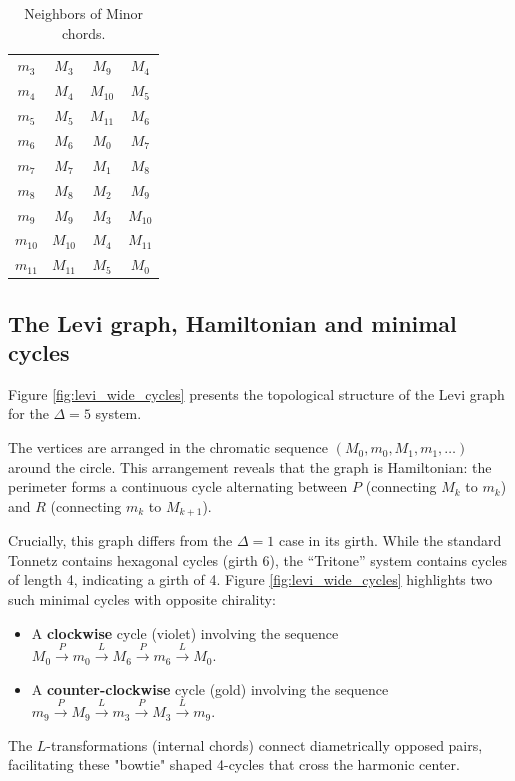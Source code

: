 \documentclass[12pt,letterpaper]{amsart}
\begin{document}
\begin{table}[H]
\begin{minipage}[t]{0.48\textwidth}
\begin{tabular}{|c||c|c|c|}
            $m_3$ & $M_3$ & $M_9$ & $M_4$ \\
            $m_4$ & $M_4$ & $M_{10}$ & $M_5$ \\
            $m_5$ & $M_5$ & $M_{11}$ & $M_6$ \\
            $m_6$ & $M_6$ & $M_0$ & $M_7$ \\
            $m_7$ & $M_7$ & $M_1$ & $M_8$ \\
            $m_8$ & $M_8$ & $M_2$ & $M_9$ \\
            $m_9$ & $M_9$ & $M_3$ & $M_{10}$ \\
            $m_{10}$ & $M_{10}$ & $M_4$ & $M_{11}$ \\
            $m_{11}$ & $M_{11}$ & $M_5$ & $M_0$ \\
            \hline
        \end{tabular}
        \caption{Neighbors of Minor chords.}
        \label{tab:neighbors_m_6_1}
    \end{minipage}
\end{table}

\subsection{The Levi graph, Hamiltonian and minimal cycles}

Figure \ref{fig:levi_wide_cycles} presents the topological structure of the Levi graph for the $\Delta=5$ system.

The vertices are arranged in the chromatic sequence $(M_0, m_0, M_1, m_1, \dots)$ around the circle. This arrangement reveals that the graph is Hamiltonian: the perimeter forms a continuous cycle alternating between $P$ (connecting $M_k$ to $m_k$) and $R$ (connecting $m_k$ to $M_{k+1}$).

Crucially, this graph differs from the $\Delta=1$ case in its girth. While the standard Tonnetz contains hexagonal cycles (girth 6), the ``Tritone'' system contains cycles of length 4, indicating a girth of 4. Figure \ref{fig:levi_wide_cycles} highlights two such minimal cycles with opposite chirality:
\begin{itemize}
    \item A \textbf{clockwise} cycle (violet) involving the sequence $M_0 \xrightarrow{P} m_0 \xrightarrow{L} M_6 \xrightarrow{P} m_6 \xrightarrow{L} M_0$.
    \item A \textbf{counter-clockwise} cycle (gold) involving the sequence $m_9 \xrightarrow{P} M_9 \xrightarrow{L} m_3 \xrightarrow{P} M_3 \xrightarrow{L} m_9$.
\end{itemize}
The $L$-transformations (internal chords) connect diametrically opposed pairs, facilitating these "bowtie" shaped 4-cycles that cross the harmonic center.
\end{document}
